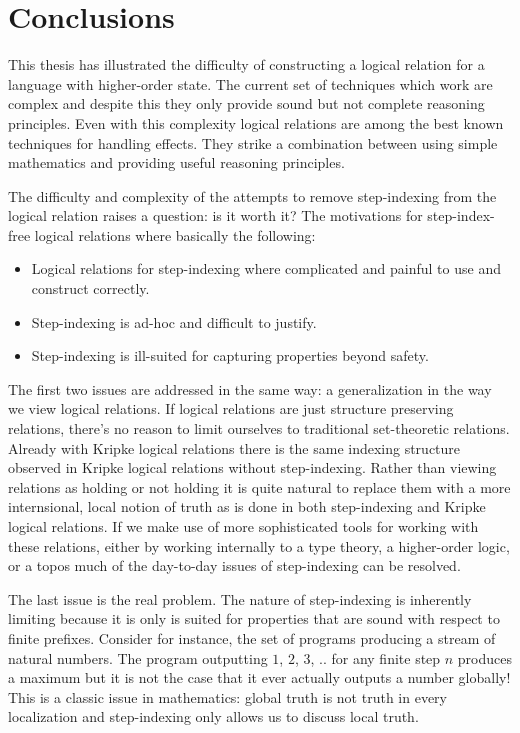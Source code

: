 \section{Conclusions}

This thesis has illustrated the difficulty of constructing a logical
relation for a language with higher-order state. The current set of
techniques which work are complex and despite this they only provide
sound but not complete reasoning principles. Even with this complexity
logical relations are among the best known techniques for handling
effects. They strike a combination between using simple mathematics
and providing useful reasoning principles.

The difficulty and complexity of the attempts to remove step-indexing
from the logical relation raises a question: is it worth it? The
motivations for step-index-free logical relations where basically the
following:
\begin{itemize}
\item Logical relations for step-indexing where complicated and
  painful to use and construct correctly.
\item Step-indexing is ad-hoc and difficult to justify.
\item Step-indexing is ill-suited for capturing properties beyond
  safety.
\end{itemize}
The first two issues are addressed in the same way: a generalization
in the way we view logical relations. If logical relations are just
structure preserving relations, there's no reason to limit ourselves
to traditional set-theoretic relations. Already with Kripke logical
relations there is the same indexing structure observed in Kripke
logical relations without step-indexing. Rather than viewing relations
as holding or not holding it is quite natural to replace them with a
more internsional, local notion of truth as is done in both
step-indexing and Kripke logical relations. If we make use of more
sophisticated tools for working with these relations, either by
working internally to a type theory, a higher-order logic, or a topos
much of the day-to-day issues of step-indexing can be resolved.

The last issue is the real problem. The nature of step-indexing is
inherently limiting because it is only is suited for properties that
are sound with respect to finite prefixes. Consider for instance, the
set of programs producing a stream of natural numbers. The program
outputting $1$, $2$, $3$, .. for any finite step $n$ produces a
maximum but it is not the case that it ever actually outputs a number
globally! This is a classic issue in mathematics: global truth is not
truth in every localization and step-indexing only allows us to
discuss local truth.

